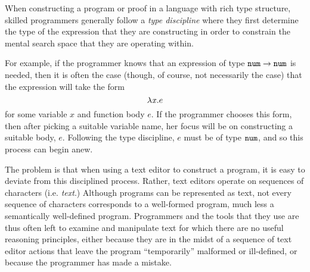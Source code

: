 



When constructing a program or proof in a language with rich type
structure, skilled programmers generally follow a \emph{type discipline}
where they first determine the type of the expression that they are
constructing in order to constrain the mental search space that they are
operating within.

For example, if the programmer knows that an expression of type
$\texttt{num} \rightarrow \texttt{num}$ is needed, then it is often the case (though, of course, not
necessarily the case) that the expression will take the form $$\lambda \mathit{x}.e$$
for some variable $x$ and function body $e$. If the programmer chooses this
form, then after picking a suitable variable name, her focus will be on
constructing a suitable body, $e$. Following the type discipline, $e$ must
be of type $\texttt{num}$, and so this process can begin anew.

The problem is that when using a text
editor to construct a program, it is easy to deviate from this disciplined process.  Rather, text editors operate on sequences of
characters (i.e. \emph{text}.) Although programs can be represented as text, not
every sequence of characters corresponds to a well-formed program, much
less a semantically well-defined program. Programmers and the tools that they use are thus 
often left to examine and manipulate text for which there are no useful
reasoning principles, either because they are in the midst of a sequence of
text editor actions that leave the program ``temporarily'' malformed or ill-defined, or because the programmer has made a mistake.

